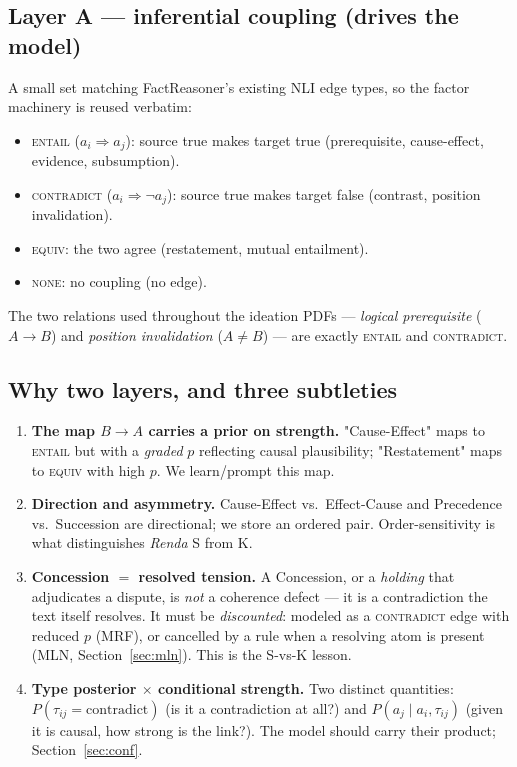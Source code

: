 \documentclass[11pt]{article}
\begin{document}
\subsection{Layer A --- inferential coupling (drives the model)}
A small set matching FactReasoner's existing NLI edge types, so the factor machinery is
reused verbatim:
\begin{itemize}[leftmargin=*,nosep]
  \item \textsc{entail} ($a_i\!\Rightarrow\! a_j$): source true makes target true
        (prerequisite, cause-effect, evidence, subsumption).
  \item \textsc{contradict} ($a_i\!\Rightarrow\!\neg a_j$): source true makes target false
        (contrast, position invalidation).
  \item \textsc{equiv}: the two agree (restatement, mutual entailment).
  \item \textsc{none}: no coupling (no edge).
\end{itemize}
The two relations used throughout the ideation PDFs --- \emph{logical prerequisite}
($A\!\to\!B$) and \emph{position invalidation} ($A\!\neq\!B$) --- are exactly \textsc{entail}
and \textsc{contradict}.

\subsection{Why two layers, and three subtleties}
\begin{enumerate}[leftmargin=*]
  \item \textbf{The map $B\!\to\!A$ carries a prior on strength.} "Cause-Effect" maps to
        \textsc{entail} but with a \emph{graded} $p$ reflecting causal plausibility;
        "Restatement" maps to \textsc{equiv} with high $p$. We learn/prompt this map.
  \item \textbf{Direction and asymmetry.} Cause-Effect vs.\ Effect-Cause and Precedence
        vs.\ Succession are directional; we store an ordered pair. Order-sensitivity is
        what distinguishes \emph{Renda} S from K.
  \item \textbf{Concession $=$ resolved tension.} A Concession, or a \emph{holding} that
        adjudicates a dispute, is \emph{not} a coherence defect --- it is a contradiction
        the text itself resolves. It must be \emph{discounted}: modeled as a
        \textsc{contradict} edge with reduced $p$ (MRF), or cancelled by a rule when a
        resolving atom is present (MLN, Section~\ref{sec:mln}). This is the S-vs-K lesson.
  \item \textbf{Type posterior $\times$ conditional strength.} Two distinct quantities:
        $P(\tau_{ij}=\text{contradict})$ (is it a contradiction at all?) and
        $P(a_j\mid a_i,\tau_{ij})$ (given it is causal, how strong is the link?). The
        model should carry their product; Section~\ref{sec:conf}.
\end{enumerate}
\end{document}
